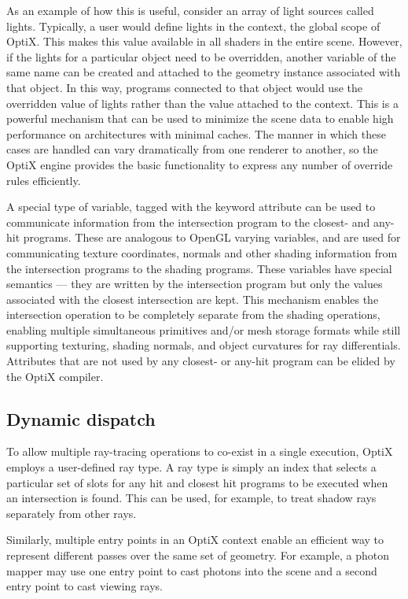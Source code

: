 As an example of how this is useful, consider an array of light
sources called lights. Typically, a user would define lights in the
context, the global scope of OptiX. This makes this value available in all shaders in the entire scene. However, if the lights for
a particular object need to be overridden, another variable of the
same name can be created and attached to the geometry instance
associated with that object. In this way, programs connected to that
object would use the overridden value of lights rather than the value
attached to the context. This is a powerful mechanism that can be
used to minimize the scene data to enable high performance on architectures with minimal caches. The manner in which these cases
are handled can vary dramatically from one renderer to another, so
the OptiX engine provides the basic functionality to express any
number of override rules efficiently.

A special type of variable, tagged with the keyword attribute can be
used to communicate information from the intersection program to
the closest- and any-hit programs. These are analogous to OpenGL
varying variables, and are used for communicating texture coordinates, normals and other shading information from the intersection
programs to the shading programs. These variables have special semantics — they are written by the intersection program but only the
values associated with the closest intersection are kept. This mechanism enables the intersection operation to be completely separate
from the shading operations, enabling multiple simultaneous primitives and/or mesh storage formats while still supporting texturing,
shading normals, and object curvatures for ray differentials. Attributes that are not used by any closest- or any-hit program can be
elided by the OptiX compiler.

\subsection{ Dynamic dispatch}

To allow multiple ray-tracing operations to co-exist in a single execution, OptiX employs a user-defined ray type. A ray type is simply
an index that selects a particular set of slots for any hit and closest
hit programs to be executed when an intersection is found. This can
be used, for example, to treat shadow rays separately from other
rays.


Similarly, multiple entry points in an OptiX context enable an efficient way to represent different passes over the same set of geometry. For example, a photon mapper may use one entry point to
cast photons into the scene and a second entry point to cast viewing
rays.

